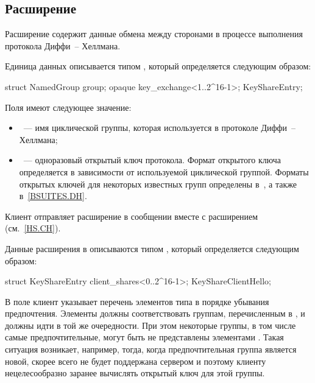 \subsection{Расширение }\label{HS.Ext.ks} 

Расширение  содержит данные обмена между сторонами
в процессе выполнения протокола Диффи~-- Хеллмана.

Единица данных описывается типом , который определяется 
следующим образом:
%
\begin{codeblock}
struct {
  NamedGroup group;
  opaque key_exchange<1..2^16-1>;
} KeyShareEntry;
\end{codeblock}

Поля  имеют следующее значение:
\begin{itemize}
\item
{}~--- имя циклической группы, которая используется в протоколе 
Диффи~-- Хеллмана;
\item
{}~--- одноразовый открытый ключ протокола.
%
Формат открытого ключа определяется в зависимости от используемой циклической 
группой. Форматы открытых ключей для некоторых известных групп 
определены в~\cite{RFC8446}, а также в~\ref{BSUITES.DH}.
\end{itemize}

Клиент отправляет расширение  в сообщении 
 вместе с расширением 
 (см.~\ref{HS.CH}).

Данные расширения  в  описываются 
типом , который определяется следующим образом:
%
\begin{codeblock}
struct {
  KeyShareEntry client_shares<0..2^16-1>;
} KeyShareClientHello;
\end{codeblock}

В поле  клиент указывает перечень элементов 
типа  в порядке убывания предпочтения.
%
Элементы должны соответствовать группам, перечисленным в 
, и должны идти в той же очередности.
%
При этом некоторые группы, в том числе самые предпочтительные, могут быть не 
представлены элементами .
%
Такая ситуация возникает, например, тогда, когда предпочтительная группа
является новой, скорее всего не будет поддержана сервером и поэтому клиенту 
нецелесообразно заранее вычислять открытый ключ для этой группы.

